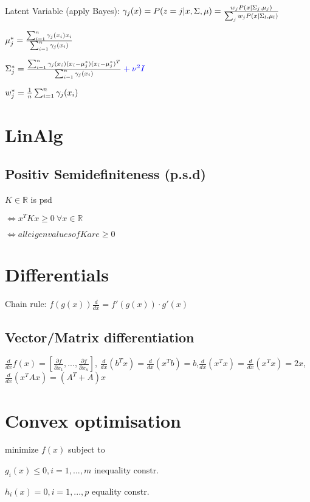 \documentclass[11pt,twocolumn]{article}
\begin{document}
Latent Variable (apply Bayes): $\gamma_j(x) 
= P(z=j|x,\Sigma, \mu) 
= {{w_j P(x|\Sigma_j, \mu_j)}\over{\sum_j w_j P(x|\Sigma_l , \mu_l)}}$ 


$\mu_j^* = {{\sum_{i=1}^n \gamma_j(x_i)x_i}\over{\sum_{i=1}^n \gamma_j(x_i)}} $ 

$\Sigma_j^* = {{\sum_{i=1}^n \gamma_j (x_i)(x_i - \mu_j^*)(x_i-\mu_j^*)^T}\over{\sum_{i=1}^n \gamma_j(x_i)}} \color{blue} + \nu^2 I$

$w_j^* = {1 \over {n}} \sum_{i=1}^n \gamma_j(x_i)$

\section{LinAlg}

\subsection{Positiv Semidefiniteness (p.s.d)}

$K \in \mathbb{R}$ is psd 

$\iff x^TKx \geq 0 ~\forall x \in \mathbb{R}$


$\iff all eigenvalues of K are \geq 0$


\section{Differentials}

Chain rule: $ f(g(x)) \frac{d}{dx} = f'(g(x)) \cdot g'(x)$

\subsection{Vector/Matrix differentiation}

$\frac{d}{dx} f(x) = \left[ \frac{\partial f }{\partial x_1} ,...,\frac{\partial f}{\partial x_n} \right]$, $\frac{d}{dx}(b^T x) = \frac{d}{dx} (x^T b) = b$,$\frac{d}{dx}(x^T x) = \frac{d}{dx} (x^T x) = 2x$,$\frac{d}{dx}(x^T A x) = (A^T + A) x$


\section{Convex optimisation}

minimize $f(x)$ subject to 

$g_i(x) \leq 0, i = 1,...,m$ inequality constr.

$h_i(x) = 0, i = 1,...,p$ equality constr.
\end{document}
